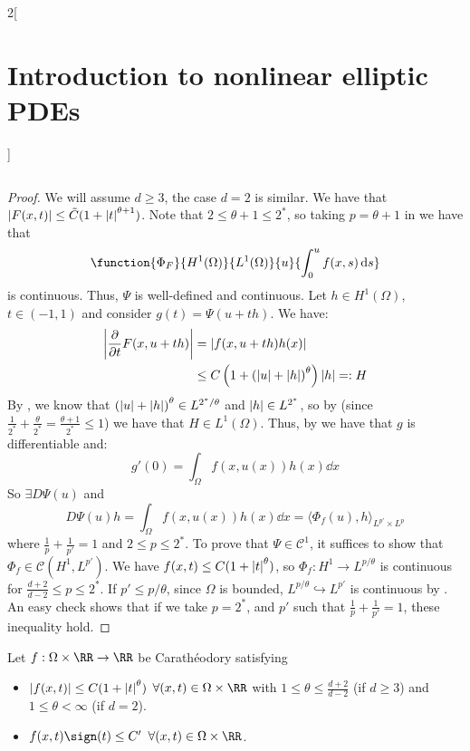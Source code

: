 \documentclass[../../../main_math.tex]{subfiles}
\begin{document}
\begin{multicols}{2}[\section{Introduction to nonlinear elliptic PDEs}]
\begin{proposition}
$$    $$
  \end{proposition}
  \begin{proof}
    We will assume $d\geq 3$, the case $d=2$ is similar. We have that $\abs{F(x,t)}\leq \tilde{C}(1+\abs{t}^{\theta+1})$. Note that $2\leq \theta+1\leq 2^*$, so taking $p=\theta+1$ in  we have that
    $$
      \function{\Phi_F}{H^1(\Omega)}{L^{1}(\Omega)}{u}{\int_0^{u}f(x,s)\dd{s}}
    $$
    is continuous. Thus, $\Psi$ is well-defined and continuous. Let $h\in H^1(\Omega)$, $t\in (-1,1)$ and consider $g(t)=\Psi(u+th)$. We have:
    \begin{align*}
      \abs{\pdv{}{t}F(x,u+th)} & =\abs{f(x,u+th)h(x)}                                      \\
                               & \leq C\left(1+{(\abs{u}+\abs{h})}^\theta\right)\abs{h}=:H
    \end{align*}
    By , we know that ${(\abs{u}+\abs{h})}^\theta\in L^{2^*/\theta}$ and $\abs{h}\in L^{2^*}$, so by  (since $\frac{1}{2^*}+\frac{\theta}{2^*}=\frac{\theta+1}{2^*}\leq 1$) we have that $H\in L^1(\Omega)$. Thus, by  we have that $g$ is differentiable and:
    $$
      g'(0)=\int_\Omega f(x,u(x))h(x)\dd{x}
    $$
    So $\exists D\Psi(u)$ and $$
      D\Psi(u)h=\int_\Omega f(x,u(x))h(x)\dd{x}={\langle \Phi_f(u), h\rangle}_{L^{p'}\times L^p}
    $$
    where $\frac{1}{p}+\frac{1}{p'}=1$ and $2\leq p\leq 2^*$. To prove that $\Psi\in\mathcal{C}^1$, it suffices to show that $\Phi_f\in \mathcal{C}(H^1,L^{p'})$. We have $f(x,t)\leq C(1+\abs{t}^\theta)$, so $\Phi_f:H^1\to L^{p/\theta}$ is continuous for $\frac{d+2}{d-2}\leq p\leq 2^*$. If $p'\leq p/\theta$, since $\Omega$ is bounded, $L^{p/\theta}\hookrightarrow L^{p'}$ is continuous by . An easy check shows that if we take $p=2^*$, and $p'$ such that $\frac{1}{p}+\frac{1}{p'}=1$, these inequality hold.
  \end{proof}
  \begin{theorem}
    Let $f:\Omega\times \RR\to\RR$ be Carathéodory satisfying
    \begin{itemize}
      \item $\abs{f(x,t)}\leq C(1+\abs{t}^\theta)$ $\forall (x,t)\in \Omega\times \RR$ with $1\leq \theta\leq \frac{d+2}{d-2}$ (if $d\geq 3$) and $1\leq \theta<\infty$ (if $d=2$).
      \item $f(x,t)\sign(t)\leq C'$ $\forall (x,t)\in \Omega\times \RR$.
    \end{itemize}

\end{theorem}
\end{multicols}
\end{document}

